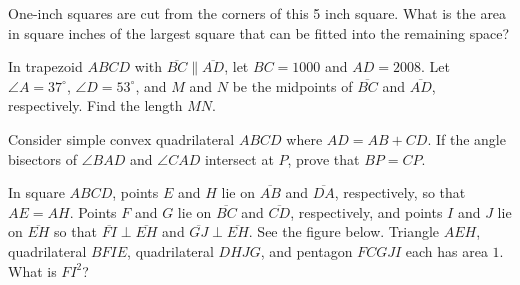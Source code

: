 \documentclass{article}
\begin{document}
\begin{prob}[AMC 8 2017/25]{3}
One-inch squares are cut from the corners of this 5 inch square.  What is the area in square inches of the largest square that can be fitted into the remaining space?

\begin{center}
\end{center}

\end{prob}

\begin{prob}[AIME II 2008/5]{3}
In trapezoid $ABCD$ with $\overline{BC}\parallel\overline{AD}$, let $BC = 1000$ and $AD = 2008$. Let $\angle A = 37^\circ$, $\angle D = 53^\circ$, and $M$ and $N$ be the midpoints of $\overline{BC}$ and $\overline{AD}$, respectively. Find the length $MN$.
\end{prob}

\begin{prob}{4}
Consider simple convex quadrilateral $ABCD$ where $AD=AB+CD.$ If the angle bisectors of $\angle BAD$ and $\angle CAD$ intersect at $P$, prove that $BP=CP.$ %
\end{prob}

\begin{req}[AMC 10B 2020/21]{9}
In square $ABCD$, points $E$ and $H$ lie on $\overline{AB}$ and $\overline{DA}$, respectively, so that $AE=AH.$ Points $F$ and $G$ lie on $\overline{BC}$ and $\overline{CD}$, respectively, and points $I$ and $J$ lie on $\overline{EH}$ so that $\overline{FI} \perp \overline{EH}$ and $\overline{GJ} \perp \overline{EH}$. See the figure below. Triangle $AEH$, quadrilateral $BFIE$, quadrilateral $DHJG$, and pentagon $FCGJI$ each has area $1.$ What is $FI^2$?
\end{req}
\end{document}
